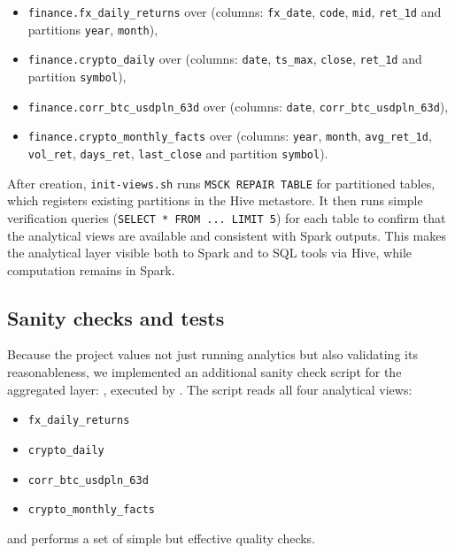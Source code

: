 \documentclass{article}
\begin{document}
\begin{itemize}
\item
  \texttt{finance.fx\_daily\_returns} over
   (columns:
  \texttt{fx\_date}, \texttt{code}, \texttt{mid}, \texttt{ret\_1d} and
  partitions \texttt{year}, \texttt{month}),
\item
  \texttt{finance.crypto\_daily} over
   (columns:
  \texttt{date}, \texttt{ts\_max}, \texttt{close}, \texttt{ret\_1d} and
  partition \texttt{symbol}),
\item
  \texttt{finance.corr\_btc\_usdpln\_63d} over
   (columns:
  \texttt{date}, \texttt{corr\_btc\_usdpln\_63d}),
\item
  \texttt{finance.crypto\_monthly\_facts} over
   (columns:
  \texttt{year}, \texttt{month}, \texttt{avg\_ret\_1d}, \texttt{vol\_ret},
  \texttt{days\_ret}, \texttt{last\_close} and partition \texttt{symbol}).
\end{itemize}

After creation, \texttt{init-views.sh} runs \texttt{MSCK REPAIR TABLE} for
partitioned tables, which registers existing partitions in the Hive
metastore. It then runs simple verification queries
(\texttt{SELECT * FROM ... LIMIT 5}) for each table to confirm that the
analytical views are available and consistent with Spark outputs. This
makes the analytical layer visible both to Spark and to SQL tools via
Hive, while computation remains in Spark.

\subsection{Sanity checks and tests}

Because the project values not just running analytics but also validating
its reasonableness, we implemented an additional sanity check script for
the aggregated layer: , executed by
. The script reads all four
analytical views:
\begin{itemize}
\item \texttt{fx\_daily\_returns}
\item \texttt{crypto\_daily}
\item \texttt{corr\_btc\_usdpln\_63d}
\item \texttt{crypto\_monthly\_facts}
\end{itemize}
and performs a set of simple but effective quality checks.
\end{document}
